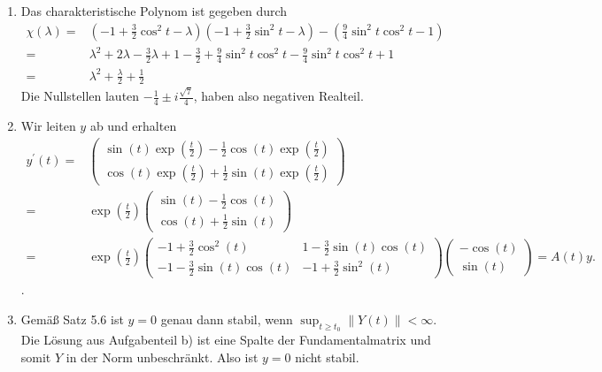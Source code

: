 \begin{solution}
\begin{enumerate}[label = \textbf{\alph*)}]
  \item Das charakteristische Polynom ist gegeben durch
  \begin{align*}
    \chi (\lambda) =& (-1 + \frac{3}{2}\cos^2 t - \lambda)(-1 + \frac{3}{2}\sin^2 t - \lambda) - (\frac{9}{4}\sin^2 t \cos^2 t - 1) \\
    =& \lambda^2 +2\lambda - \frac{3}{2} \lambda + 1 - \frac{3}{2} + \frac{9}{4}\sin^2 t \cos^2 t - \frac{9}{4} \sin^{2} t \cos^2 t + 1 \\
    =& \lambda^2 + \frac{\lambda}{2} + \frac{1}{2}
  \end{align*}
  Die Nullstellen lauten $- \frac{1}{4} \pm i\frac{\sqrt{7}}{4}$, haben also negativen Realteil.
  \item Wir leiten $y$ ab und erhalten
  \begin{align*}
    y^{\prime}(t) =& \begin{pmatrix}
      \sin(t)\exp(\frac{t}{2}) -\frac{1}{2}\cos(t)\exp(\frac{t}{2}) \\ \cos(t)\exp(\frac{t}{2}) + \frac{1}{2}\sin(t)\exp(\frac{t}{2})
    \end{pmatrix} \\
    =& \exp\left(\frac{t}{2}\right) \begin{pmatrix}
      \sin(t) -\frac{1}{2}\cos(t) \\ \cos(t) + \frac{1}{2}\sin(t)
    \end{pmatrix} \\
    =& \exp\left(\frac{t}{2}\right)\begin{pmatrix}
      -1 + \frac{3}{2}\cos^2(t) & 1 -\frac{3}{2}\sin(t)\cos(t) \\
      -1 - \frac{3}{2}\sin(t)\cos(t) & -1 + \frac{3}{2}\sin^2(t)
    \end{pmatrix}\begin{pmatrix}
      -\cos(t) \\ \sin(t)
    \end{pmatrix} = A(t)y.
  \end{align*}.
  \item Gemäß Satz 5.6 ist $y = 0$ genau dann stabil, wenn ${\sup}_{t \geq t_0} \| Y(t)\| < \infty$. Die Lösung aus Aufgabenteil b) ist eine Spalte der Fundamentalmatrix und somit $Y$ in der Norm unbeschränkt. Also ist $y= 0$ nicht stabil.
  \end{enumerate}
\end{solution}
